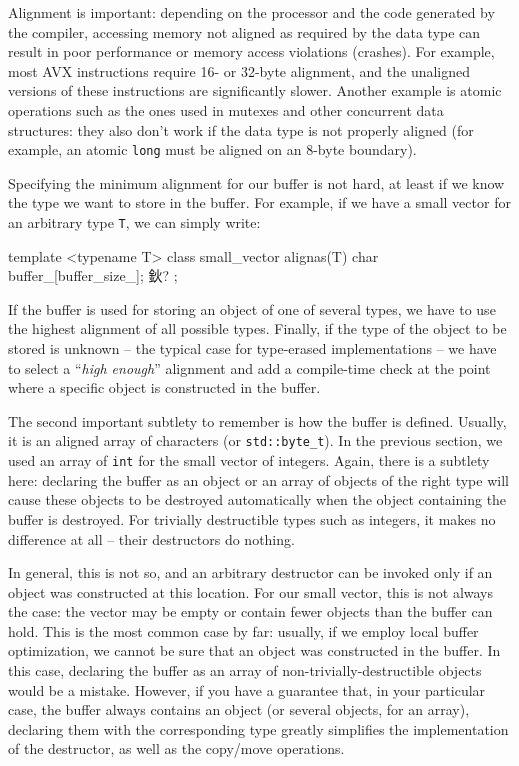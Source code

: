Alignment is important: depending on the processor and the code generated by the compiler, accessing memory not aligned as required by the data type can result in poor performance or memory access violations (crashes). For example, most AVX instructions require 16- or 32-byte alignment, and the unaligned versions of these instructions are significantly slower. Another example is atomic operations such as the ones used in mutexes and other concurrent data structures: they also don't work if the data type is not properly aligned (for example, an atomic \texttt{long} must be aligned on an 8-byte boundary).

Specifying the minimum alignment for our buffer is not hard, at least if we know the type we want to store in the buffer. For example, if we have a small vector for an arbitrary type \texttt{T}, we can simply write:

\begin{code}
template <typename T>
class small_vector {
  alignas(T) char buffer_[buffer_size_];
  鈥?
};
\end{code}

If the buffer is used for storing an object of one of several types, we have to use the highest alignment of all possible types. Finally, if the type of the object to be stored is unknown -- the typical case for type-erased implementations -- we have to select a ``\emph{high enough}'' alignment and add a compile-time check at the point where a specific object is constructed in the buffer.

The second important subtlety to remember is how the buffer is defined. Usually, it is an aligned array of characters (or \texttt{std::byte\_t}). In the previous section, we used an array of \texttt{int} for the small vector of integers. Again, there is a subtlety here: declaring the buffer as an object or an array of objects of the right type will cause these objects to be destroyed automatically when the object containing the buffer is destroyed. For trivially destructible types such as integers, it makes no difference at all -- their destructors do nothing.

In general, this is not so, and an arbitrary destructor can be invoked only if an object was constructed at this location. For our small vector, this is not always the case: the vector may be empty or contain fewer objects than the buffer can hold. This is the most common case by far: usually, if we employ local buffer optimization, we cannot be sure that an object was constructed in the buffer. In this case, declaring the buffer as an array of non-trivially-destructible objects would be a mistake. However, if you have a guarantee that, in your particular case, the buffer always contains an object (or several objects, for an array), declaring them with the corresponding type greatly simplifies the implementation of the destructor, as well as the copy/move operations.

